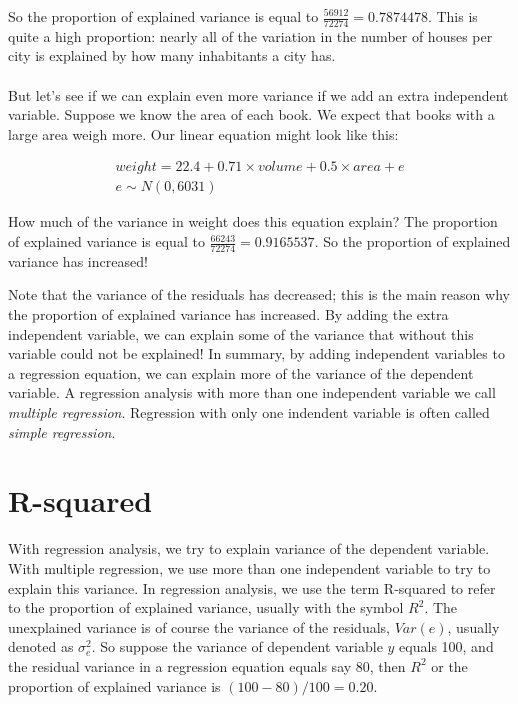 \documentclass[]{report}\usepackage[]{graphicx}\usepackage[]{color}
\begin{document}
So the proportion of explained variance is equal to $ \frac{56912}{72274}=0.7874478$. This is quite a high proportion: nearly all of the variation in the number of houses per city is explained by how many inhabitants a city has.
\\
\\
But let's see if we can explain even more variance if we add an extra independent variable. Suppose we know the area of each book. We expect that books with a large area weigh more. Our linear equation might look like this:


\begin{eqnarray}
weight = 22.4 + 0.71 \times volume + 0.5 \times  area + e \\
e \sim N(0, 6031)
\end{eqnarray}

How much of the variance in weight does this equation explain? The proportion of explained variance is equal to $ \frac{66243}{72274}=0.9165537$. So the proportion of explained variance has increased!

Note that the variance of the residuals has decreased; this is the main reason why the proportion of explained variance has increased. By adding the extra independent variable, we can explain some of the variance that without this variable could not be explained! In summary, by adding independent variables to a regression equation, we can explain more of the variance of the dependent variable. A regression analysis with more than one independent variable we call \textit{multiple regression}. Regression with only one indendent variable is often called \textit{simple regression}.







\section{R-squared}

With regression analysis, we try to explain variance of the dependent variable. With multiple regression, we use more than one independent variable to try to explain this variance. In regression analysis, we use the term R-squared to refer to the proportion of explained variance, usually with the symbol $R^2$. The unexplained variance is of course the variance of the residuals, $Var(e)$, usually denoted as $\sigma_e^2$. So suppose the variance of dependent variable $y$ equals 100, and the residual variance in a regression equation equals say 80, then $R^2$ or the proportion of explained variance is $(100-80)/100=0.20$.
\end{document}
